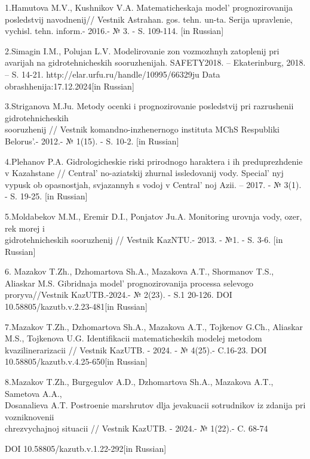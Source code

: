 \begin{references}
1.Hamutova M.V., Kushnikov V.A. Matematicheskaja model'{}
prognozirovanija posledstvij navodnenij// Vestnik Astrahan. gos. tehn.
un-ta. Serija upravlenie, vychisl. tehn. inform.- 2016.- № 3. - S.
109-114. {[}in Russian{]}

2.Simagin I.M., Polujan L.V. Modelirovanie zon vozmozhnyh zatoplenij pri
avarijah na gidrotehnicheskih sooruzhenijah. SAFETY2018. --
Ekaterinburg, 2018. -- S. 14-21.
http://elar.urfu.ru/handle/10995/66329ju Data
obrashhenija:17.12.2024{[}in Russian{]}

3.Striganova M.Ju. Metody ocenki i prognozirovanie posledstvij pri
razrushenii gidrotehnicheskih \\sooruzhenij // Vestnik
komandno-inzhenernogo instituta MChS Respubliki
Belorus'.- 2012.- № 1(15). - S. 10-2. {[}in Russian{]}

4.Plehanov P.A. Gidrologicheskie riski prirodnogo haraktera i ih
preduprezhdenie v Kazahstane // Central' no-aziatskij
zhurnal issledovanij vody. Special' nyj vypusk ob
opasnostjah, svjazannyh s vodoj v Central' noj Azii. --
2017. - № 3(1). - S. 19-25. {[}in Russian{]}

5.Moldabekov M.M., Eremir D.I., Ponjatov Ju.A. Monitoring urovnja vody,
ozer, rek morej i \\gidrotehnicheskih sooruzhenij // Vestnik KazNTU.-
2013. - №1. - S. 3-6. {[}in Russian{]}

6. Mazakov T.Zh., Dzhomartova Sh.A., Mazakova A.T., Shormanov T.S.,
Aliaskar M.S. Gibridnaja model'{} prognozirovanija
processa selevogo proryva//Vestnik KazUTB.-2024.- № 2(23). - S.1 20-126.
DOI \\10.58805/kazutb.v.2.23-481{[}in Russian{]}

7.Mazakov T.Zh., Dzhomartova Sh.A., Mazakova A.T., Tojkenov G.Ch.,
Aliaskar M.S., Tojkenova U.G. Identifikacii matematicheskih modelej
metodom kvazilinerarizacii // Vestnik KazUTB. - 2024. - № 4(25).-
C.16-23. DOI 10.58805/kazutb.v.4.25-650{[}in Russian{]}

8.Mazakov T.Zh., Burgegulov A.D., Dzhomartova Sh.A., Mazakova A.T.,
Sametova A.A., \\Dosanalieva A.T. Postroenie marshrutov dlja jevakuacii
sotrudnikov iz zdanija pri vozniknovenii \\chrezvychajnoj situacii //
Vestnik KazUTB. - 2024.- № 1(22).- C. 68-74

DOI 10.58805/kazutb.v.1.22-292{[}in Russian{]}
\end{references}

